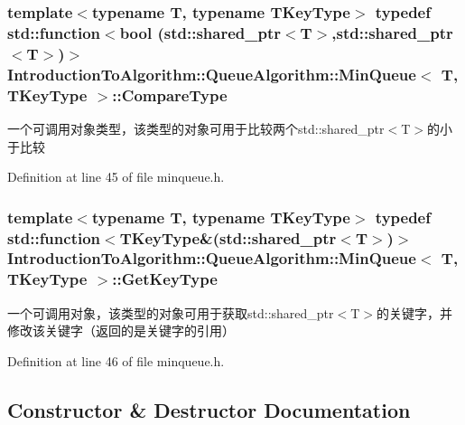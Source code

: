 \subsubsection[{Compare\+Type}]{\setlength{\rightskip}{0pt plus 5cm}template$<$typename T, typename T\+Key\+Type$>$ typedef std\+::function$<$bool (std\+::shared\+\_\+ptr$<$T$>$,std\+::shared\+\_\+ptr$<$T$>$)$>$ {\bf Introduction\+To\+Algorithm\+::\+Queue\+Algorithm\+::\+Min\+Queue}$<$ T, T\+Key\+Type $>$\+::{\bf Compare\+Type}}\label{class_introduction_to_algorithm_1_1_queue_algorithm_1_1_min_queue_a8f2f5b5d2b7097bbc6edda7b9c9228a6}
一个可调用对象类型，该类型的对象可用于比较两个std\+::shared\+\_\+ptr$<$\+T$>$的小于比较 

Definition at line 45 of file minqueue.\+h.

\hypertarget{class_introduction_to_algorithm_1_1_queue_algorithm_1_1_min_queue_a391cb754ab172d1d4cdefd34130b917c}{}
\subsubsection[{Get\+Key\+Type}]{\setlength{\rightskip}{0pt plus 5cm}template$<$typename T, typename T\+Key\+Type$>$ typedef std\+::function$<$T\+Key\+Type\&(std\+::shared\+\_\+ptr$<$T$>$)$>$ {\bf Introduction\+To\+Algorithm\+::\+Queue\+Algorithm\+::\+Min\+Queue}$<$ T, T\+Key\+Type $>$\+::{\bf Get\+Key\+Type}}\label{class_introduction_to_algorithm_1_1_queue_algorithm_1_1_min_queue_a391cb754ab172d1d4cdefd34130b917c}
一个可调用对象，该类型的对象可用于获取std\+::shared\+\_\+ptr$<$\+T$>$的关键字，并修改该关键字（返回的是关键字的引用） 

Definition at line 46 of file minqueue.\+h.



\subsection{Constructor \& Destructor Documentation}
\hypertarget{class_introduction_to_algorithm_1_1_queue_algorithm_1_1_min_queue_a98e54e4e2c19918032b09e23e79a25e5}{}
